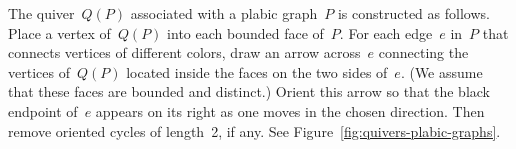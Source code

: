 \documentclass[ALCO,ThmDefs,Unicode,epreuves,published]{cedram}
\begin{document}
\begin{definition}
\label{def:Q(P)}
The quiver~$Q(P)$ associated with a plabic graph~$P$ is constructed as follows.
Place a vertex of~$Q(P)$ into each bounded face of~$P$.
For each edge~$e$ in~$P$ that connects vertices of different colors,
draw an arrow across~$e$ connecting the vertices of~$Q(P)$ located inside the faces 
on the two sides of~$e$. (We assume that these faces are bounded and distinct.) 
Orient this arrow so that the black endpoint of~$e$ appears on its right as one moves
in the chosen direction. 
Then remove oriented cycles of length~2, if any. 
See Figure~\ref{fig:quivers-plabic-graphs}.
\end{definition}

\end{document}
